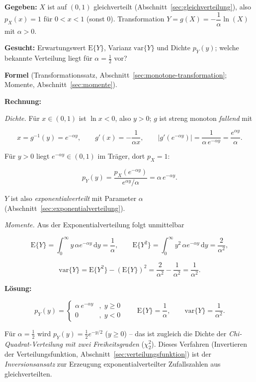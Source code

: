 \begin{beispiel}[Funktion einer Zufallsvariablen -- $Y = -\tfrac{1}{\alpha}\ln(X)$]

\textbf{Gegeben:} $X$ ist auf $(0,1)$ gleichverteilt
(Abschnitt~\ref{sec:gleichverteilung}), also $p_X(x) = 1$ für $0 < x < 1$
(sonst $0$). Transformation $Y = g(X) = -\dfrac{1}{\alpha}\ln(X)$ mit
$\alpha > 0$.

\textbf{Gesucht:} Erwartungswert $\mathrm{E}\{Y\}$, Varianz $\mathrm{var}\{Y\}$
und Dichte $p_Y(y)$; welche bekannte Verteilung liegt für $\alpha = \tfrac12$
vor?

\textbf{Formel} (Transformationssatz, Abschnitt~\ref{sec:monotone-transformation};
Momente, Abschnitt~\ref{sec:momente}).

\textbf{Rechnung:}

\emph{Dichte.} Für $x \in (0,1)$ ist $\ln x < 0$, also $y > 0$; $g$ ist streng
monoton \emph{fallend} mit

$$
x = g^{-1}(y) = e^{-\alpha y}, \qquad
g'(x) = -\frac{1}{\alpha x}, \qquad
\left|g'\!\left(e^{-\alpha y}\right)\right| = \frac{1}{\alpha\, e^{-\alpha y}}
= \frac{e^{\alpha y}}{\alpha}.
$$

Für $y > 0$ liegt $e^{-\alpha y} \in (0,1)$ im Träger, dort $p_X = 1$:

$$
p_Y(y) = \frac{p_X\!\left(e^{-\alpha y}\right)}{e^{\alpha y}/\alpha}
       = \alpha\, e^{-\alpha y}.
$$

$Y$ ist also \emph{exponentialverteilt} mit Parameter $\alpha$
(Abschnitt~\ref{sec:exponentialverteilung}).

\emph{Momente.} Aus der Exponentialverteilung folgt unmittelbar

$$
\mathrm{E}\{Y\} = \int_0^\infty y\,\alpha e^{-\alpha y}\,\mathrm{d}y
= \frac{1}{\alpha}, \qquad
\mathrm{E}\{Y^2\} = \int_0^\infty y^2\,\alpha e^{-\alpha y}\,\mathrm{d}y
= \frac{2}{\alpha^2},
$$

$$
\mathrm{var}\{Y\} = \mathrm{E}\{Y^2\} - \left(\mathrm{E}\{Y\}\right)^2
= \frac{2}{\alpha^2} - \frac{1}{\alpha^2} = \frac{1}{\alpha^2}.
$$

\textbf{Lösung:}

$$
\boxed{\;p_Y(y) = \begin{cases} \alpha\, e^{-\alpha y} & , \; y \geq 0 \\[4pt]
0 & , \; y < 0 \end{cases}
\qquad
\mathrm{E}\{Y\} = \frac{1}{\alpha}, \qquad
\mathrm{var}\{Y\} = \frac{1}{\alpha^2}.\;}
$$

Für $\alpha = \tfrac12$ wird $p_Y(y) = \tfrac12 e^{-y/2}$ ($y \geq 0$) -- das ist
zugleich die Dichte der \emph{Chi-Quadrat-Verteilung mit zwei Freiheitsgraden}
($\chi^2_2$). Dieses Verfahren (Invertieren der Verteilungsfunktion,
Abschnitt~\ref{sec:verteilungsfunktion}) ist der \emph{Inversionsansatz} zur
Erzeugung exponentialverteilter Zufallszahlen aus gleichverteilten.

\end{beispiel}


